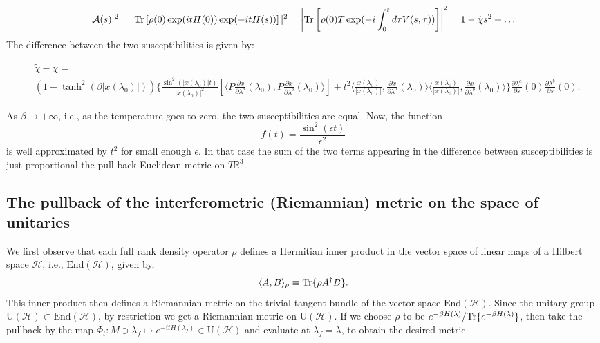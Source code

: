 \begin{equation*}
|\mathcal{A}(s)|^2 =|\text{Tr} \left[\rho(0)\exp(it H(0))\exp(-it H(s))\right]|^2=\left|\text{Tr}\left[\rho(0) T\exp(-i\int_{0}^{t}d\tau V(s,\tau))\right]\right|^2=1-\tilde{\chi}s^2 +\dots
\end{equation*}
The difference between the two susceptibilities is given by:
\begin{footnotesize}\begin{eqnarray*}
&\tilde{\chi}-\chi=\\
& (1-\tanh^2(\beta|x(\lambda_0)|))\{\frac{\sin^2(|x(\lambda_0)|t)}{|x(\lambda_0)|^2}[\langle P \frac{\partial x}{\partial \lambda^a}(\lambda_0),P\frac{\partial x}{\partial \lambda^b}(\lambda_0)\rangle]+t^2\langle \frac{x(\lambda_0)}{|x(\lambda_0)|},\frac{\partial x}{\partial \lambda^a}(\lambda_0) \rangle\langle \frac{x(\lambda_0)}{|x(\lambda_0)|},\frac{\partial x}{\partial \lambda^b}(\lambda_0)\rangle\}\frac{\partial \lambda^a}{\partial s}(0)\frac{\partial \lambda^b}{\partial s}(0).
\end{eqnarray*}\end{footnotesize}
As $\beta\to +\infty$, i.e., as the temperature goes to zero, the two susceptibilities are equal. Now, the function
\begin{equation*}
f(t)=\frac{\sin^2(\epsilon t)}{\epsilon^2}
\end{equation*}
is well approximated by $t^2$ for small enough $\epsilon$. In that case the sum of the two terms appearing in the difference between susceptibilities is just proportional the pull-back Euclidean metric on $T\mathbb{R}^3$. 

%

\subsection*{The pullback of the interferometric (Riemannian) metric on the space of unitaries}

We first observe that each full rank density operator $\rho$ defines a Hermitian inner product in the vector space of linear maps of a Hilbert space $\mathscr{H}$, i.e., $\text{End}(\mathscr{H})$, given by,
\begin{equation*}
\langle A,B\rangle_{\rho}\equiv \text{Tr} \{\rho A^{\dagger}B\}.
\end{equation*}
This inner product then defines a Riemannian metric on the trivial tangent bundle of the vector space $\text{End}(\mathscr{H})$. Since the unitary group $\text{U}(\mathscr{H})\subset \text{End}(\mathscr{H})$, by restriction we get a Riemannian metric on $\text{U}(\mathscr{H})$. If we choose $\rho$ to be $e^{-\beta H(\lambda)}/\text{Tr} \{e^{-\beta H(\lambda)}\}$, then take the pullback by the map $\Phi_{t}: M\ni \lambda_f\mapsto e^{-it H(\lambda_f)}\in\text{U}(\mathscr{H})$ and evaluate at $\lambda_f=\lambda$, to obtain the desired metric.


